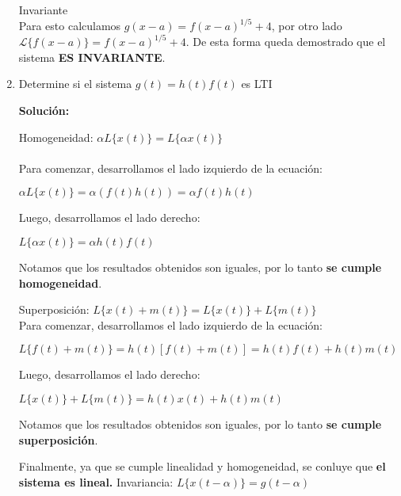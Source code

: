 \documentclass[letterpaper, 12pt]{article}
\newif\ifanswers
\begin{document}
\begin{enumerate}
       
        {\color{red}
         Invariante\\
        Para esto calculamos $g(x-a) = f(x-a)^{1/5} +4$, por otro lado $\mathcal{L}\{f(x-a)\} =f(x-a)^{1/5} +4$. De esta forma queda demostrado que el sistema \textbf{ES INVARIANTE}.}


    \fi


     \item Determine si el sistema $g(t) = h(t)f(t)$ es LTI
     \ifanswers
       {\color{red} \textbf{Solución:}
   


                Homogeneidad: $\alpha L\{x(t)\} = L\{\alpha x(t)\}$\\ \\
                Para comenzar, desarrollamos el lado izquierdo de la ecuación:
                \begin{center}
                $\alpha L\{x(t)\} = \alpha(f(t)h(t)) = \alpha f(t) h(t)$
                \end{center}
                Luego, desarrollamos el lado derecho:
                \begin{center}
                $ L\{\alpha x(t)\} = \alpha h(t)f(t) $
                \end{center}
            Notamos que los resultados obtenidos son iguales, por lo tanto \textbf{se cumple homogeneidad}.

           Superposici\'on: $L\{x(t) + m(t)\} = L\{x(t)\} + L\{m(t)\}$\\
            
            Para comenzar, desarrollamos el lado izquierdo de la ecuación:
                \begin{center}
                    $L\{f(t) + m(t)\} = h(t)[f(t)+m(t)] = h(t)f(t) + h(t)m(t) $
                \end{center}
            Luego, desarrollamos el lado derecho:
                \begin{center}
                    $L\{x(t)\} + L\{m(t)\} = h(t)x(t) + h(t)m(t)$
                \end{center}
                
            Notamos que los resultados obtenidos son iguales, por lo tanto \textbf{se cumple superposición}.
    
        Finalmente, ya que se cumple linealidad y homogeneidad, se conluye que \textbf{el sistema es lineal.}
        Invariancia: $L\{x(t-\alpha)\} = g(t-\alpha)$
        
}
\end{enumerate}
\end{document}
